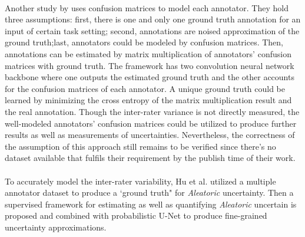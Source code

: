 \documentclass[12pt]{extarticle}
\begin{document}
\paragraph{}
Another study by \cite{zhang2020disentangling} uses confusion matrices to
model each annotator. They hold three assumptions: first, there is one and
only one ground truth annotation for an input of certain task setting; 
second, annotations are noised approximation of the ground truth;last, annotators could be modeled by confusion matrices.
Then, annotations can be estimated by matrix multiplication of annotators'
confusion matrices with ground truth. The framework has two convolution neural network backbone
where one outputs the estimated ground truth and the other accounts for the confusion matrices
of each annotator. 
A unique ground truth could be learned by minimizing the 
cross entropy of the matrix multiplication result and the real annotation.
Though the inter-rater variance is not directly measured, the well-modeled annotators'
confusion matrices could be utilized to produce further results
as well as measurements of uncertainties.
Nevertheless, the correctness of the assumption of this approach
still remains to be verified since there's no dataset available 
that fulfils their requirement by the publish time of their work.
\paragraph{}
To accurately model the inter-rater variability, Hu et al.\cite{hu2019supervised} utilized a multiple annotator dataset
to produce a `ground truth" for \textit{Aleatoric} uncertainty. Then a supervised framework for estimating
as well as quantifying \textit{Aleatoric} uncertain is proposed and combined with probabilistic U-Net
to produce fine-grained uncertainty approximations. 
\end{document}
